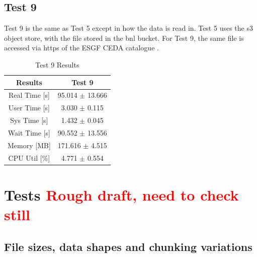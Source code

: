 \documentclass{article}
\begin{document}

\subsection{Test 9}
Test 9 is the same as Test 5 except in how the data is read in. Test 5 uses the s3 object store, with the file stored in the bnl bucket. For Test 9, the same file is accessed via https of the ESGF CEDA catalogue . 

\begin{table}[h!]
    \centering
    \begin{tabular}{cc}
        \hline
        \textbf{Results} & Test 9          \\ \hline
        Real Time [s]    &  95.014 $\pm$ 13.666              \\
        User Time [s]    &  3.030 $\pm$ 0.115                \\
        Sys Time [s]     &  1.432 $\pm$ 0.045                \\
        Wait Time [s]    &  90.552 $\pm$ 13.556              \\
        Memory [MB]      &  171.616 $\pm$ 4.515              \\
        CPU Util [\%]    &  4.771 $\pm$ 0.554                \\
        \hline
    \end{tabular}
    \caption{Test 9 Results}
    \label{tab:T9_Results}
\end{table}




\section{Tests \textcolor{red}{Rough draft, need to check still}}


\subsection{File sizes, data shapes and chunking variations}
\end{document}
